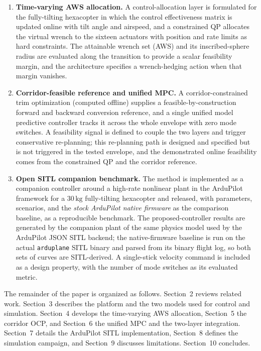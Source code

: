 \documentclass[preprint,3p,11pt]{elsarticle}
\newcommand{\SI}[2]{\ensuremath{#1\,#2}}
\newcommand{\kilogram}{\mathrm{kg}}
\begin{document}
\begin{enumerate}[label=(\roman*),leftmargin=2.2em]
  \item \textbf{Time-varying AWS allocation.} A control-allocation layer is
  formulated for the fully-tilting hexacopter in which the control
  effectiveness matrix is updated online with tilt angle and airspeed, and a
  constrained QP allocates the virtual wrench to the sixteen actuators with
  position and rate limits as hard constraints. The attainable wrench set
  (AWS) and its inscribed-sphere radius are evaluated along the transition to
  provide a scalar feasibility margin, and the architecture specifies a
  wrench-hedging action when that margin vanishes.
  \item \textbf{Corridor-feasible reference and unified MPC.} A
  corridor-constrained trim optimization (computed offline) supplies a
  feasible-by-construction forward and backward conversion reference, and a
  single unified model predictive controller tracks it across the whole
  envelope with zero mode switches. A feasibility signal is defined to couple
  the two layers and trigger conservative re-planning; this re-planning path is
  designed and specified but is not triggered in the tested envelope, and the
  demonstrated online feasibility comes from the constrained QP and the
  corridor reference.
  \item \textbf{Open SITL companion benchmark.} The method is implemented as a
  companion controller around a high-rate nonlinear plant in the ArduPilot
  framework for a \SI{30}{\kilogram} fully-tilting hexacopter and released,
  with parameters, scenarios, and the \emph{stock ArduPilot native firmware}
  as the comparison baseline, as a
  reproducible benchmark. The proposed-controller results are generated
  by the companion plant of the same physics model used by the ArduPilot JSON
  SITL backend; the native-firmware baseline is run on the actual
  \texttt{arduplane} SITL binary and parsed from its binary flight log, so
  both sets of curves are SITL-derived. A single-stick velocity command is included as a design property,
  with the number of mode switches as its evaluated metric.
\end{enumerate}

The remainder of the paper is organized as follows. Section~2 reviews related
work. Section~3 describes the platform and the two models used for control
and simulation. Section~4 develops the time-varying AWS allocation, Section~5
the corridor OCP, and Section~6 the unified MPC and the two-layer
integration. Section~7 details the ArduPilot SITL implementation, Section~8
defines the simulation campaign, and Section~9 discusses limitations.
Section~10 concludes.
\end{document}
